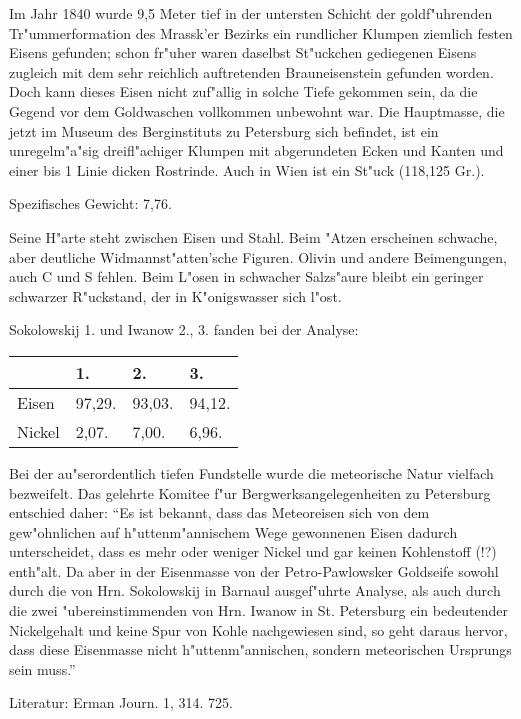 \documentclass[a4paper, 11pt, oneside]{article}
\begin{document}
Im Jahr 1840 wurde 9,5 Meter tief in der untersten Schicht der goldf"uhrenden Tr"ummerformation des Mrassk'er Bezirks ein rundlicher Klumpen ziemlich festen Eisens gefunden; schon fr"uher waren daselbst St"uckchen gediegenen Eisens zugleich mit dem sehr reichlich auftretenden Brauneisenstein gefunden worden. Doch kann dieses Eisen nicht zuf"allig in solche Tiefe gekommen sein, da die Gegend vor dem Goldwaschen vollkommen unbewohnt war. Die Hauptmasse, die jetzt im Museum des Berginstituts zu Petersburg sich befindet, ist ein unregelm"a"sig dreifl"achiger Klumpen mit abgerundeten Ecken und Kanten und einer bis 1 Linie dicken Rostrinde. Auch in Wien ist ein St"uck (118,125 Gr.).

Spezifisches Gewicht: 7,76.

Seine H"arte steht zwischen Eisen und Stahl. Beim "Atzen erscheinen schwache, aber deutliche Widmannst"atten'sche Figuren. Olivin und andere Beimengungen, auch C und S fehlen. Beim L"osen in schwacher Salzs"aure bleibt ein geringer schwarzer R"uckstand, der in K"onigswasser sich l"ost.

Sokolowskij 1. und Iwanow 2., 3. fanden bei der Analyse:
\begin{table}[H]
    \centering\swabfamily\Large
    \begin{tabular}{l l l l}
         & 1. & 2. & 3. \\ \hline
        Eisen & 97,29. & 93,03. & 94,12. \\
        Nickel & 2,07. & 7,00. & 6,96. \\
    \end{tabular}
\end{table}

Bei der au"serordentlich tiefen Fundstelle wurde die meteorische Natur vielfach bezweifelt. Das gelehrte Komitee f"ur Bergwerksangelegenheiten zu Petersburg entschied daher: "`Es ist bekannt, dass das Meteoreisen sich von dem gew"ohnlichen auf h"uttenm"annischem Wege gewonnenen Eisen dadurch unterscheidet, dass es mehr oder weniger Nickel und gar keinen Kohlenstoff (!?) enth"alt. Da aber in der Eisenmasse von der Petro-Pawlowsker Goldseife sowohl durch die von Hrn. Sokolowskij in Barnaul ausgef"uhrte Analyse, als auch durch die zwei "ubereinstimmenden von Hrn. Iwanow in St. Petersburg ein bedeutender Nickelgehalt und keine Spur von Kohle nachgewiesen sind, so geht daraus hervor, dass diese Eisenmasse nicht h"uttenm"annischen, sondern meteorischen Ursprungs sein muss."'

\normalsize
Literatur: Erman Journ. 1, 314. 725.
\end{document}
